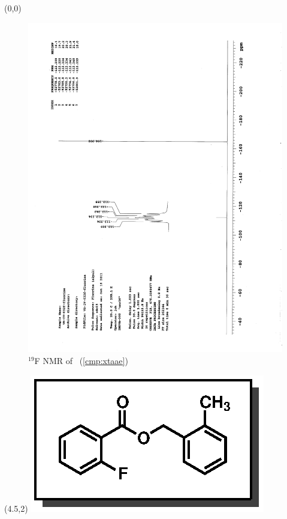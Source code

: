 \clearpage
\begin{textblock}{20}(0,0)
\begin{figure}[htb]
\caption{$^{19}$F NMR of  \CMPxtaae\ (\ref{cmp:xtaae})}
\includegraphics[scale=0.75, trim = 0mm 0mm 0mm 5mm,
clip]{chp_asymmetric/images/nmr/xtaaeF}
\vspace{-100pt}
\end{figure}
\end{textblock}
\begin{textblock}{1}(4.5,2)
\includegraphics[scale=0.8, angle=90]{chp_asymmetric/images/xtaae}
\end{textblock}
\clearpage

